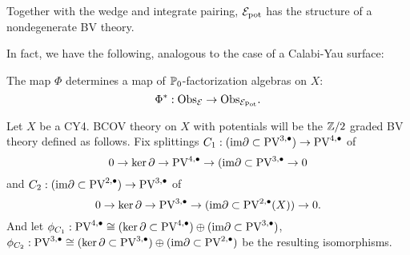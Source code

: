 \documentclass[11pt]{article}
\begin{document}
Together with the wedge and integrate pairing, $\mathcal{E}_{\rm pot}$ has the structure of a nondegenerate BV theory.

In fact, we have the following, analogous to the case of a Calabi-Yau surface:
\begin{prop}
The map $\Phi$ determines a map of $\mathbb{P}_0$-factorization algebras on $X$:
\[
\Phi^* : {\rm Obs}_{\mathcal{E}} \to {\rm Obs}_{\mathcal{E}_{\rm Pot}} .
\]
\end{prop} 

\iffalse
Let \(X\) be a CY4. BCOV theory on \(X\) with potentials will be the \(\mathbb{Z}/2\) graded BV theory defined as follows. Fix splittings \(C_1: (\text{im}\partial\subset\text{PV}^{3,\bullet})\to \text{PV}^{4,\bullet}\) of  \[0\to\ker\partial\to \text{PV}^{4,\bullet}\to(\text{im}\partial\subset\text{PV}^{3,\bullet}\to 0\] and \(C_2: (\text{im}\partial\subset\text{PV}^{2,\bullet})\to\text{PV}^{3,\bullet}\) of \[0\to\ker\partial\to\text{PV}^{3,\bullet}\to(\text{im}\partial\subset\text{PV}^{2,\bullet}(X))\to 0.\] And let \(\phi_{C_1} : \text{PV}^{4,\bullet}\cong(\ker\partial\subset\text{PV}^{4,\bullet})\oplus(\text{im}\partial\subset\text{PV}^{3,\bullet})\), \(\phi_{C_2}: \text{PV}^{3,\bullet}\cong(\ker\partial\subset\text{PV}^{3,\bullet})\oplus(\text{im}\partial\subset\text{PV}^{2,\bullet})\) be the resulting isomorphisms.
\end{document}
